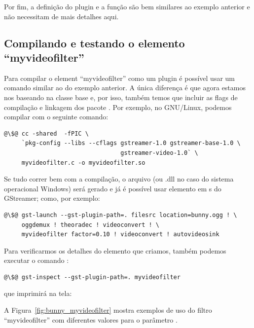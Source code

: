 Por fim, a definição do plugin e a função  são bem
similares ao exemplo anterior e não necessitam de mais detalhes aqui.

\subsection*{Compilando e testando o elemento ``myvideofilter''}
Para compilar o element ``myvideofilter'' como um plugin é possível usar um
comando similar ao do exemplo anterior.  A única diferença é que agora estamos
nos baseando na classe base  e, por isso, também temos que
incluir as flags de compilação e linkagem dos pacote .
Por exemplo, no GNU/Linux, podemos compilar com o seguinte comando:

\begin{lstlisting}[style=command]
@\$@ cc -shared  -fPIC \
     `pkg-config --libs --cflags gstreamer-1.0 gstreamer-base-1.0 \
                                 gstreamer-video-1.0` \
     myvideofilter.c -o myvideofilter.so
\end{lstlisting}

Se tudo correr bem com a compilação, o arquivo  (ou .dll no
caso do sistema operacional Windows) será gerado e já é possível usar elemento
em s do GStreamer; como, por exemplo:
\begin{lstlisting}[style=command]
@\$@ gst-launch --gst-plugin-path=. filesrc location=bunny.ogg ! \
     oggdemux ! theoradec ! videoconvert ! \
     myvideofilter factor=0.10 ! videoconvert ! autovideosink
\end{lstlisting}

Para verificarmos os detalhes do elemento que criamos, também podemos executar
o comando \C{gst-inspect}: 
\begin{lstlisting}[style=command]
@\$@ gst-inspect --gst-plugin-path=. myvideofilter
\end{lstlisting}
que imprimirá na tela:



A Figura~\ref{fig:bunny_myvideofilter} mostra exemplos de uso do filtro
``myvideofilter'' com diferentes valores para o parâmetro .

